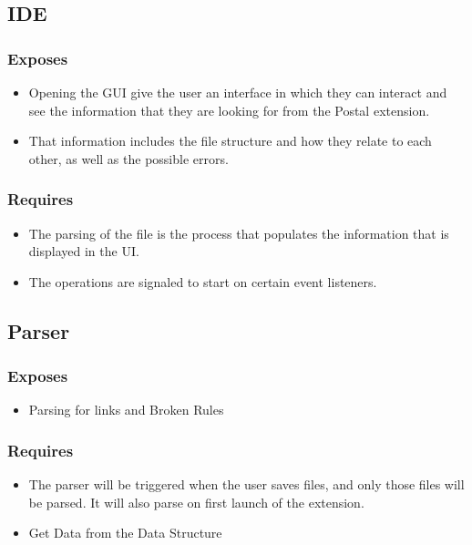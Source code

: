 \documentclass[letterpaper,10pt,titlepage,draftclsnofoot,onecolumn,onesided] {IEEEtran}
\begin{document}
\subsection{IDE}
	
\subsubsection{Exposes}
\begin{itemize}
	\item Opening the GUI give the user an interface in which they can interact and see the information that they are looking for from the Postal extension.
	\item That information includes the file structure and how they relate to each other, as well as the possible errors. 
\end{itemize}
		
\subsubsection{Requires}
\begin{itemize}
	\item The parsing of the file is the process that populates the information that is displayed in the UI.
	\item The operations are signaled to start on certain event listeners.
\end{itemize}
			
\subsection{Parser}

\subsubsection{Exposes}
\begin{itemize}
	\item Parsing for links and Broken Rules
\end{itemize}
		
\subsubsection{Requires}
\begin{itemize}
	\item The parser will be triggered when the user saves files, and only those files will be parsed. 
It will also parse on first launch of the extension.
	\item Get Data from the Data Structure
\end{itemize}
	
\end{document}

